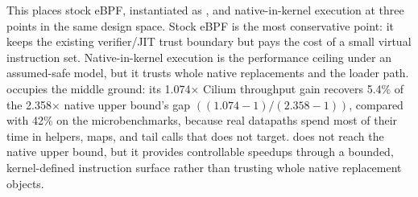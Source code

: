 This places stock eBPF, \tool instantiated as \lang, and native-in-kernel execution at three points in the same design space. Stock eBPF is the most conservative point: it keeps the existing verifier/JIT trust boundary but pays the cost of a small virtual instruction set. Native-in-kernel execution is the performance ceiling under an assumed-safe model, but it trusts whole native replacements and the loader path. \lang occupies the middle ground: its 1.074$\times$ Cilium throughput gain recovers 5.4\% of the 2.358$\times$ native upper bound's gap $((1.074{-}1)/(2.358{-}1))$, compared with 42\% on the microbenchmarks, because real datapaths spend most of their time in helpers, maps, and tail calls that \lang does not target. \lang does not reach the native upper bound, but it provides controllable speedups through a bounded, kernel-defined instruction surface rather than trusting whole native replacement objects.
